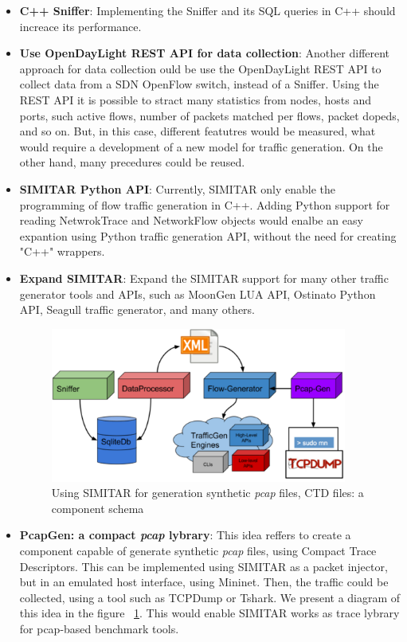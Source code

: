 \begin{itemize}
	\item \textbf{C++ Sniffer}: Implementing the Sniffer and its SQL queries in C++ should increace its performance.
	
	\item \textbf{Use OpenDayLight REST API for data collection}: Another different approach for data collection ould be use the OpenDayLight REST API to collect data from a SDN OpenFlow switch, instead of a Sniffer. Using the REST API it is possible to stract many statistics from nodes, hosts and ports, such active flows, number of packets matched per flows, packet dopeds, and so on. But, in this case, different featutres would be measured, what would require a development of a new model for traffic generation. On the other hand, many precedures could be reused. 
	
	\item \textbf{SIMITAR Python API}: Currently, SIMITAR only enable the programming of flow traffic generation in C++. Adding Python support for reading NetwrokTrace and NetworkFlow objects would enalbe an easy expantion using Python traffic generation API, without the  need for creating "C++" wrappers.
	
	\item \textbf{Expand SIMITAR}: Expand the SIMITAR support for many other traffic generator tools and APIs, such as MoonGen LUA API, Ostinato Python API, Seagull traffic generator, and many others.
	
		\begin{figure}[!ht]
			\centering
			\includegraphics[height=2.0in]{figures/ch6/pcap-gen}
			\caption{Using SIMITAR for generation synthetic \textit{pcap} files, CTD files: a component schema}
			\label{fig:pcap-gen}
		\end{figure}
	
	\item \textbf{PcapGen: a compact \textit{pcap} lybrary}: This idea reffers to create a component capable of generate synthetic \textit{pcap} files, using Compact Trace Descriptors. This can be implemented using SIMITAR as a packet injector, but in an emulated host interface, using Mininet. Then, the traffic could be collected, using a tool such as TCPDump or Tshark. We present a diagram of this idea in the figure ~\ref{fig:pcap-gen}. This would enable SIMITAR works as trace lybrary for pcap-based benchmark tools.
	


\end{itemize}
